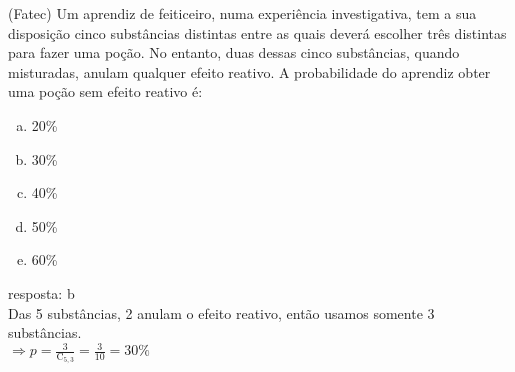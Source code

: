 \begin{ex}
   (Fatec) Um aprendiz de feiticeiro, numa experiência investigativa, tem a sua disposição cinco substâncias distintas entre as quais deverá escolher três distintas para fazer uma poção. No entanto, duas dessas cinco substâncias, quando misturadas, anulam qualquer efeito reativo. A probabilidade do aprendiz obter uma poção sem efeito reativo é:
     \begin{enumerate} [(a)]
         \item 20\%
         \item 30\%
         \item 40\%
         \item 50\%
         \item 60\%
     \end{enumerate}
      \begin{sol}
       resposta: b \\
       Das 5 substâncias, 2 anulam o efeito reativo, então usamos somente 3 substâncias.\\
        $\Longrightarrow p=\frac{3}{\mathrm{C}_{5,3}}=\frac{3}{10}=30\%$
      \end{sol}
  \end{ex}
